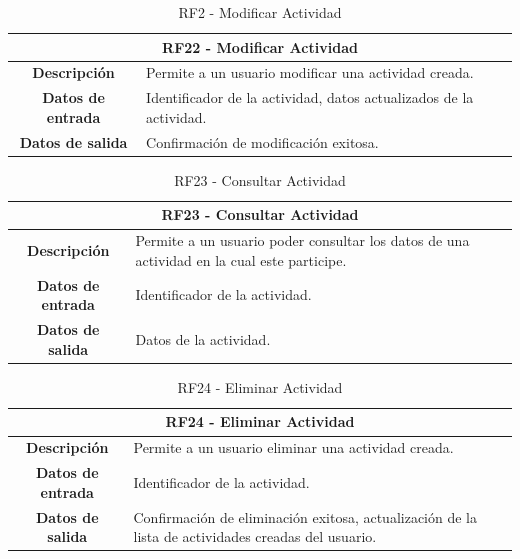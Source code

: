 \begin{table}[H]
    \centering
    \begin{tabular}{|c|p{10cm}|}
        \hline
        \multicolumn{2}{|c|}{\textbf{RF22 - Modificar Actividad}}                                      \\
        \hline
        \textbf{Descripción}      & Permite a un usuario modificar una actividad creada.               \\
        \hline
        \textbf{Datos de entrada} & Identificador de la actividad, datos actualizados de la actividad. \\
        \hline
        \textbf{Datos de salida}  & Confirmación de modificación exitosa.                              \\
        \hline
    \end{tabular}
    \caption{RF2 - Modificar Actividad}
\end{table}

\begin{table}[H]
    \centering
    \begin{tabular}{|c|p{10cm}|}
        \hline
        \multicolumn{2}{|c|}{\textbf{RF23 - Consultar Actividad}}                                                              \\
        \hline
        \textbf{Descripción}      & Permite a un usuario poder consultar los datos de una actividad en la cual este participe. \\
        \hline
        \textbf{Datos de entrada} & Identificador de la actividad.                                                             \\
        \hline
        \textbf{Datos de salida}  & Datos de la actividad.                                                                     \\
        \hline
    \end{tabular}
    \caption{RF23 - Consultar Actividad}
\end{table}

\begin{table}[H]
    \centering
    \begin{tabular}{|c|p{10cm}|}
        \hline
        \multicolumn{2}{|c|}{\textbf{RF24 - Eliminar Actividad}}                                                                       \\
        \hline
        \textbf{Descripción}      & Permite a un usuario eliminar una actividad creada.                                                \\
        \hline
        \textbf{Datos de entrada} & Identificador de la actividad.                                                                     \\
        \hline
        \textbf{Datos de salida}  & Confirmación de eliminación exitosa, actualización de la lista de actividades creadas del usuario. \\
        \hline
    \end{tabular}
    \caption{RF24 - Eliminar Actividad}
\end{table}

